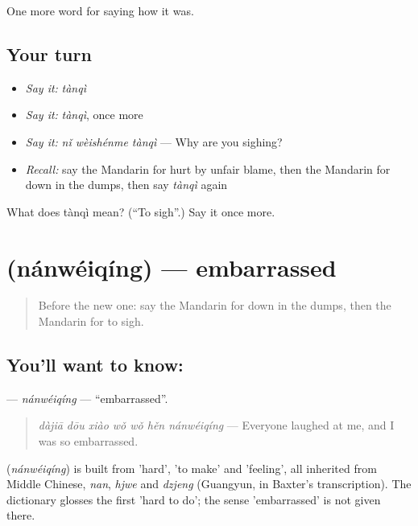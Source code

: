 \begin{grammarlens}[title={What you've built}]
One more word for saying how it was.
\end{grammarlens}

\subsection*{Your turn}
\begin{itemize}
\raggedright
  \item \emph{Say it:} \emph{tànqì}
  \item \emph{Say it:} \emph{tànqì}, once more
  \item \emph{Say it:} \emph{nǐ wèishénme tànqì} — Why are you sighing?
  \item \emph{Recall:} say the Mandarin for hurt by unfair blame, then the Mandarin for down in the dumps, then say \emph{tànqì} again
\end{itemize}

\begin{tcolorbox}[breakable,colback=teal!4,colframe=teal!35!black,title={Before you move on}]
What does tànqì mean? (\textquotedblleft{}To sigh\textquotedblright{}.) Say it once more.
\end{tcolorbox}
\section[\texorpdfstring{\zh{难为情} (nánwéiqíng)}{难为情 (nánwéiqíng)}]{ (nánwéiqíng) — embarrassed}

\label{lesson:ZH-C460-nanweiqing}



\begin{quote}
Before the new one: say the Mandarin for down in the dumps, then the Mandarin for to sigh.
\end{quote}

\subsection*{You'll want to know: }
\textbf{} — \emph{nánwéiqíng} — \textquotedblleft{}embarrassed\textquotedblright{}.

\begin{quote}
\textbf{} \emph{dàjiā dōu xiào wǒ wǒ hěn nánwéiqíng} — Everyone laughed at me, and I was so embarrassed.
\end{quote}

\begin{cousinweb}
\textbf{} (\emph{nánwéiqíng}) is built from  'hard',  'to make' and  'feeling', all inherited from Middle Chinese, \emph{nan}, \emph{hjwe} and \emph{dzjeng} (Guangyun, in Baxter's transcription). The dictionary glosses the first 'hard to do'; the sense 'embarrassed' is not given there.
\end{cousinweb}


